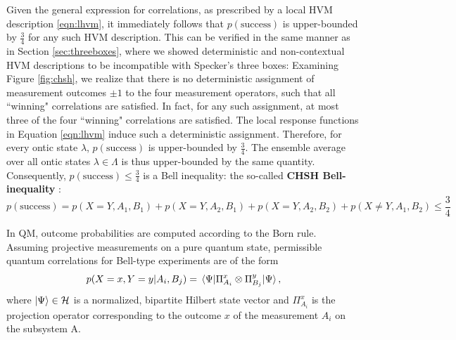 Given the general expression for correlations, as prescribed by a local HVM description \ref{eqn:lhvm}, it immediately follows that $p(\text{{success}})$ is upper-bounded by $\frac{3}{4}$ for any such HVM description. This can be verified in the same manner as in Section \ref{sec:threeboxes}, where we showed deterministic and non-contextual HVM descriptions to be incompatible with Specker's three boxes: Examining Figure \ref{fig:chsh}, we realize that there is no deterministic assignment of measurement outcomes $\pm 1$ to the four measurement operators, such that all ``winning" correlations are satisfied. In fact, for any such assignment, at most three of the four ``winning" correlations are satisfied. The local response functions in Equation \ref{eqn:lhvm} induce such a deterministic assignment. Therefore, for every ontic state $\lambda$, $p(\text{success})$ is upper-bounded by $\frac{3}{4}$. The ensemble average over all ontic states $\lambda\in\Lambda$ is thus upper-bounded by the same quantity.
Consequently, $p(\text{{success}})\leq\frac{3}{4}$ is a Bell inequality: the so-called \textbf{CHSH Bell-inequality} \cite{Clauser1969,Colbeck2019,Spekkens2012}:
\begin{equation}
    \label{eqn:chshineq}
    p(\text{success}) = p(X=Y,A_1,B_1)+p(X=Y,A_2,B_1)+p(X=Y,A_2,B_2)+p(X\neq Y,A_1,B_2)\leq \frac{3}{4}
\end{equation}

In QM, outcome probabilities are computed according to the Born rule. Assuming projective measurements on a pure quantum state, permissible quantum correlations for Bell-type experiments are of the form
\begin{equation*}
p(X=x,Y=y\vert A_i, B_j)=\expval{\Pi_{A_i}^x\otimes\Pi_{B_j}^y}{\Psi},
\end{equation*}
where $\ket{\Psi}\in\mathcal{H}$ is a normalized, bipartite Hilbert state vector and $\Pi_{A_i}^x$ is the projection operator corresponding to the outcome $x$ of the measurement $A_i$ on the subsystem A.

